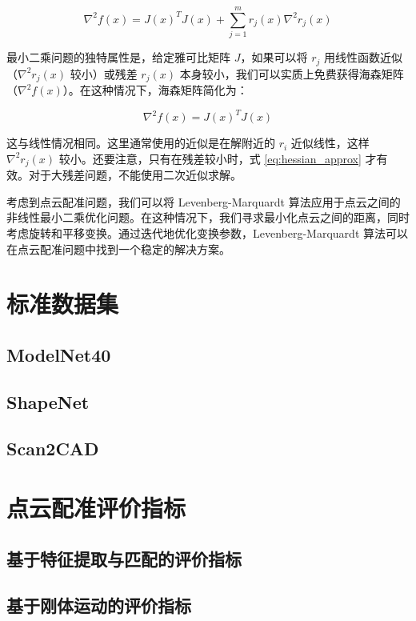 \begin{equation}
\nabla^2 f(x) = J(x)^TJ(x) + \sum_{j=1}^{m} r_j(x) \nabla^2 r_j(x)
\label{eq:hessian}
\end{equation}

最小二乘问题的独特属性是，给定雅可比矩阵 $J$，如果可以将 $r_j$ 用线性函数近似（$\nabla^2 r_j(x)$ 较小）或残差 $r_j(x)$ 本身较小，我们可以实质上免费获得海森矩阵（$\nabla^2 f(x)$）。在这种情况下，海森矩阵简化为：

\begin{equation}
\nabla^2 f(x) = J(x)^T J(x)
\label{eq:hessian_approx}
\end{equation}

这与线性情况相同。这里通常使用的近似是在解附近的 $r_i$ 近似线性，这样 $\nabla^2 r_j(x)$ 较小。还要注意，只有在残差较小时，式 \ref{eq:hessian_approx} 才有效。对于大残差问题，不能使用二次近似求解\cite{李娇娇2022基于深度学习的}。

考虑到点云配准问题，我们可以将 Levenberg-Marquardt 算法应用于点云之间的非线性最小二乘优化问题。在这种情况下，我们寻求最小化点云之间的距离，同时考虑旋转和平移变换。通过迭代地优化变换参数，Levenberg-Marquardt 算法可以在点云配准问题中找到一个稳定的解决方案。


\section{标准数据集}
\subsection{ModelNet40}
\subsection{ShapeNet}
\subsection{Scan2CAD}

\section{点云配准评价指标}
\subsection{基于特征提取与匹配的评价指标}
\subsection{基于刚体运动的评价指标}
